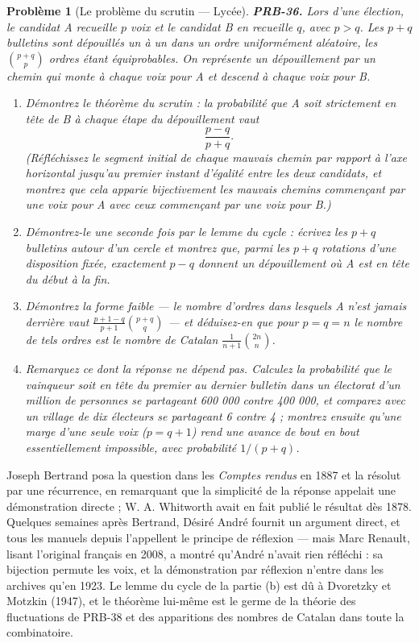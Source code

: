 \documentclass[11pt]{article}
\newtheorem{problem}{Problème}
\begin{document}
\begin{problem}[{Le problème du scrutin --- Lycée}]
\textbf{PRB-36.} Lors d'une élection, le candidat A recueille $ p $ voix et le candidat B en
recueille $ q $, avec $ p > q $. Les $ p + q $ bulletins sont dépouillés un à un dans un
ordre uniformément aléatoire, les $ \binom{p+q}{p} $ ordres étant équiprobables. On représente un
dépouillement par un chemin qui monte à chaque voix pour A et descend à chaque voix pour B.
\begin{enumerate}
\item[(a)] Démontrez le théorème du scrutin : la probabilité que A soit strictement en tête de B à chaque
étape du dépouillement vaut
\[ \frac{p-q}{p+q} . \]
(Réfléchissez le segment initial de chaque mauvais chemin par rapport à l'axe horizontal jusqu'au
premier instant d'égalité entre les deux candidats, et montrez que cela apparie bijectivement les
mauvais chemins commençant par une voix pour A avec ceux commençant par une voix pour B.)
\item[(b)] Démontrez-le une seconde fois par le lemme du cycle : écrivez les $ p+q $ bulletins autour
d'un cercle et montrez que, parmi les $ p+q $ rotations d'une disposition fixée, exactement
$ p - q $ donnent un dépouillement où A est en tête du début à la fin.
\item[(c)] Démontrez la forme faible --- le nombre d'ordres dans lesquels A n'est jamais \textit{derrière}
vaut $ \frac{p+1-q}{p+1}\binom{p+q}{q} $ --- et déduisez-en que pour $ p = q = n $ le nombre de
tels ordres est le nombre de Catalan $ \frac{1}{n+1}\binom{2n}{n} $.
\item[(d)] Remarquez ce dont la réponse ne dépend pas. Calculez la probabilité que le vainqueur soit en
tête du premier au dernier bulletin dans un électorat d'un million de personnes se partageant
600 000 contre 400 000, et comparez avec un village de dix électeurs se partageant 6 contre
4 ; montrez ensuite qu'une marge d'une seule voix ($ p = q+1 $) rend une avance de bout en bout
essentiellement impossible, avec probabilité $ 1/(p+q) $.
\end{enumerate}

\end{problem}

\noindent Joseph Bertrand posa la question dans les \textit{Comptes rendus} en 1887 et la
résolut par une récurrence, en remarquant que la simplicité de la réponse appelait une
démonstration directe ; W. A. Whitworth avait en fait publié le résultat dès 1878. Quelques
semaines après Bertrand, Désiré André fournit un argument direct, et tous les manuels depuis
l'appellent \og{} le principe de réflexion \fg{} --- mais Marc Renault, lisant l'original français en 2008, a
montré qu'André n'avait rien réfléchi : sa bijection permute les voix, et la démonstration par
réflexion n'entre dans les archives qu'en 1923. Le lemme du cycle de la partie (b) est dû à
Dvoretzky et Motzkin (1947), et le théorème lui-même est le germe de la théorie des fluctuations
de PRB-38 et des apparitions des nombres de Catalan dans toute la combinatoire.
\end{document}
